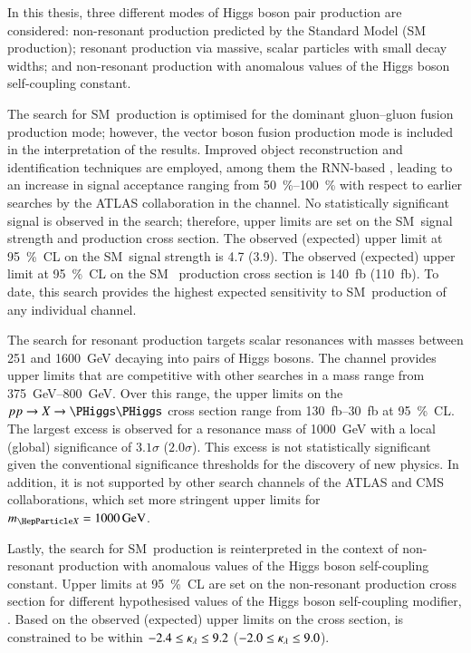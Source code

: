 In this thesis, three different modes of Higgs boson pair production are
considered: non-resonant \HH production predicted by the Standard Model (SM~\HH
production); resonant \HH production via massive, scalar particles with small
decay widths; and non-resonant \HH production with anomalous values of the Higgs
boson self-coupling constant.


The search for SM~\HH production is optimised for the dominant gluon--gluon
fusion production mode; however, the vector boson fusion production mode is
included in the interpretation of the results. Improved object reconstruction
and identification techniques are employed, among them the RNN-based \tauid,
leading to an increase in signal acceptance ranging from
\SIrange[range-units=single]{50}{100}{\percent} with respect to earlier searches
by the ATLAS collaboration in the \bbtautau channel. No statistically
significant signal is observed in the search; therefore, upper limits are set on
the SM~\HH signal strength and production cross section. The observed (expected)
upper limit at \SI{95}{\percent}~CL on the SM~\HH signal strength is 4.7 (3.9).
The observed (expected) upper limit at \SI{95}{\percent}~CL on the SM~\HH
production cross section is \SI{140}{\femto\barn} (\SI{110}{\femto\barn}). To
date, this search provides the highest expected sensitivity to SM~\HH production
of any individual channel.


The search for resonant \HH production targets scalar resonances with masses
between \num{251} and \SI{1600}{\GeV} decaying into pairs of Higgs bosons. The
\bbtautau channel provides upper limits that are competitive with other searches
in a mass range from \SIrange{375}{800}{\GeV}. Over this range, the upper limits
on the $pp \to X \to \HH$ cross section range from
\SIrange{130}{30}{\femto\barn} at \SI{95}{\percent}~CL. The largest excess is
observed for a resonance mass of \SI{1000}{\GeV} with a local (global)
significance of $3.1\sigma$ ($2.0\sigma$). This excess is not statistically
significant given the conventional significance thresholds for the discovery of
new physics. In addition, it is not supported by other search channels of the
ATLAS and CMS collaborations, which set more stringent upper limits for
$\mX = \SI{1000}{\GeV}$.


Lastly, the search for SM~\HH production is reinterpreted in the context of
non-resonant \HH production with anomalous values of the Higgs boson
self-coupling constant. Upper limits at \SI{95}{\percent}~CL are set on the
non-resonant \HH production cross section for different hypothesised values of
the Higgs boson self-coupling modifier, \klambda. Based on the observed
(expected) upper limits on the cross section, \klambda is constrained to be
within $-2.4 \leq \kappa_{\lambda} \leq 9.2$ ($-2.0 \leq \kappa_{\lambda} \leq 9.0$).


